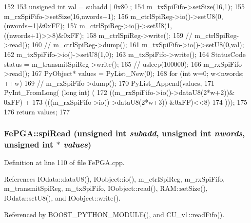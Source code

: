 \begin{DoxyCode}
152                                                                   { 
153   unsigned int val = subadd | 0x80 ; 
154   m_txSpiFifo->setSize(16,1);
155   m_rxSpiFifo->setSize(16,nwords+1);
156   m_ctrlSpiReg->io()->setU8(0,(nwords+1)&0xFF);
157   m_ctrlSpiReg->io()->setU8(1,((nwords+1)>>8)&0xFF);
158   m_ctrlSpiReg->write();
159   //  m_ctrlSpiReg->read();
160   //  m_ctrlSpiReg->dump();
161   m_txSpiFifo->io()->setU8(0,val);
162   m_txSpiFifo->io()->setU8(1,0);
163   m_txSpiFifo->write();
164   StatusCode status = m_transmitSpiReg->write();  
165   //  usleep(100000);
166   m_rxSpiFifo->read();
167   PyObject* values = PyList_New(0);
168   for (int w=0; w<nwords; ++w) {
169     //    m_rxSpiFifo->dump();
170    PyList_Append(values,
171                  PyInt_FromLong( (long int) (
172                                              ((m_rxSpiFifo->io()->dataU8(2*w+2))&
      0xFF) + 
173                                              (((m_rxSpiFifo->io()->dataU8(2*w+3))
      &0xFF)<<8)
174                                              )));
175   }
176   return values;
177 } 
\end{DoxyCode}
\hypertarget{classFePGA_a637b93fed75b576a54e723acb36cb6a3}{
\subsubsection[{spiRead}]{ FePGA::spiRead (unsigned int {\em subadd}, \/  unsigned int {\em nwords}, \/  unsigned int $\ast$ {\em values})}}
\label{classFePGA_a637b93fed75b576a54e723acb36cb6a3}


Definition at line 110 of file FePGA.cpp.

References IOdata::dataU8(), IOobject::io(), m\_\-ctrlSpiReg, m\_\-rxSpiFifo, m\_\-transmitSpiReg, m\_\-txSpiFifo, IOobject::read(), RAM::setSize(), IOdata::setU8(), and IOobject::write().

Referenced by BOOST\_\-PYTHON\_\-MODULE(), and CU\_\-v1::readFifo().


